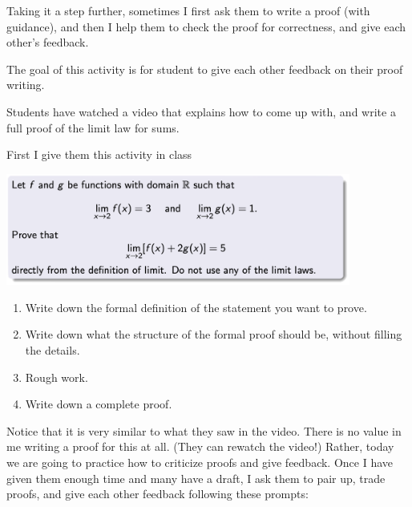 \documentclass[11pt]{article}
\begin{document}

\newpage

{Taking it a step further, sometimes I first ask them to write a proof (with guidance), and then I help them to check the proof for correctness, and give each other's feedback.
}

\begin{example}
The goal of this activity is for student to give each other feedback on their proof writing.
\begin{background}
Students have watched a video that explains how to come up with, and write a full proof of the limit law for sums.
\end{background}
\begin{question}
 First I give them this activity in class
\begin{center}
\begin{minipage}{0.8\textwidth}
	\includegraphics[width=0.85\textwidth]{EX9}
\begin{enumerate}
	\item  Write down the formal definition of the statement you want to prove.
	\item  Write down what the structure of the formal proof should be, without filling the details.
	\item  Rough work.
 	\item  Write down a complete proof.
\end{enumerate}
\end{minipage}
\end{center}
\end{question}
\begin{comments}
Notice that it is very similar to what they saw in the video.  There is no value in me writing a proof for this at all.  (They can rewatch the video!) Rather, today we are going to practice how to criticize proofs and give feedback.  Once I have given them enough time and many have a draft, I ask them to pair up, trade proofs, and give each other feedback following these prompts:
\begin{center}
\begin{minipage}{0.8\textwidth}	

\end{minipage}
\end{center}
\end{comments}
\end{example}
\end{document}
